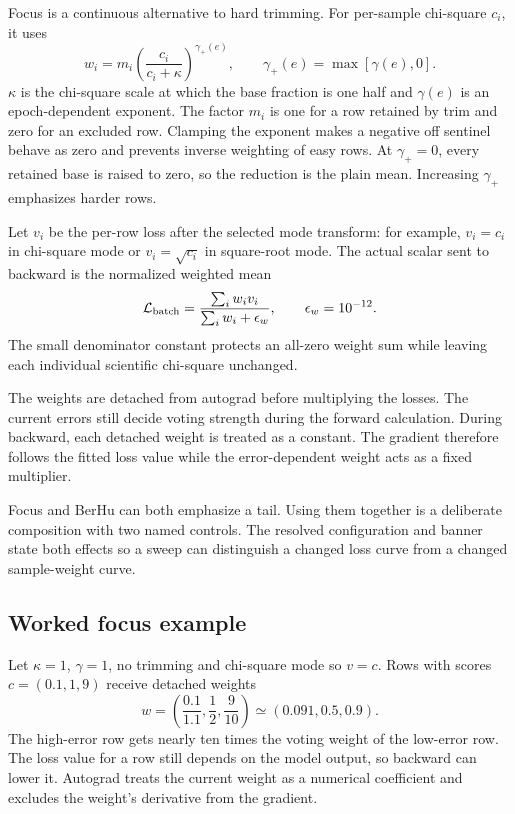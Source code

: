 \documentclass[10pt,aps,prd,twocolumn,nofootinbib]{revtex4-2}
\begin{document}
Focus is a continuous alternative to hard trimming.  For per-sample
chi-square \(c_i\), it uses
\begin{equation}
 w_i=m_i\left(\frac{c_i}{c_i+\kappa}\right)^{\gamma_+(e)},
 \qquad \gamma_+(e)=\max[\gamma(e),0].
 \label{eq:focus}
\end{equation}
\(\kappa\) is the chi-square scale at which the base fraction is one half and
\(\gamma(e)\) is an epoch-dependent exponent.  The factor $m_i$ is one for a
row retained by trim and zero for an excluded row.  Clamping the exponent
makes a negative off sentinel behave as zero and prevents inverse weighting
of easy rows.  At \(\gamma_+=0\), every retained base is raised to zero, so the
reduction is the plain mean.  Increasing \(\gamma_+\) emphasizes harder rows.

Let $v_i$ be the per-row loss after the selected mode transform: for example,
$v_i=c_i$ in chi-square mode or $v_i=\sqrt{c_i}$ in square-root mode.  The
actual scalar sent to backward is the normalized weighted mean
\begin{equation}
 \mathcal L_{\rm batch}
 =\frac{\sum_iw_iv_i}{\sum_iw_i+\epsilon_w},
 \qquad \epsilon_w=10^{-12}.
 \label{eq:focus-reduction}
\end{equation}
The small denominator constant protects an all-zero weight sum while leaving
each individual scientific chi-square unchanged.

The weights are detached from autograd before multiplying the losses.  The
current errors still decide voting strength during the forward calculation.
During backward, each detached weight is treated as a constant.  The gradient
therefore follows the fitted loss value while the error-dependent weight acts
as a fixed multiplier.

Focus and BerHu can both emphasize a tail.  Using them together is a deliberate
composition with two named controls.  The resolved configuration and banner
state both effects so a sweep can distinguish a changed loss curve from
a changed sample-weight curve.

\subsection*{Worked focus example}

Let $\kappa=1$, $\gamma=1$, no trimming and chi-square mode so $v=c$.
Rows with scores $c=(0.1,1,9)$ receive
detached weights
\begin{equation*}
 w=\left(\frac{0.1}{1.1},\frac{1}{2},\frac{9}{10}\right)
 \simeq(0.091,0.5,0.9).
\end{equation*}
The high-error row gets nearly ten times the voting weight of the low-error
row.  The loss value for a row still depends on the model output, so backward
can lower it.  Autograd treats the current weight as a numerical coefficient
and excludes the weight's derivative from the gradient.
\end{document}
